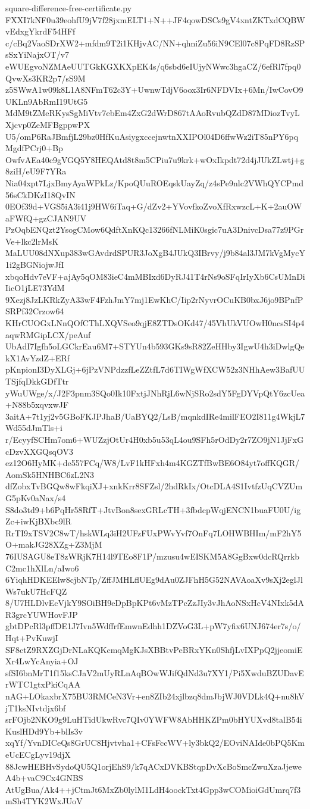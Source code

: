 \documentclass[11pt]{article}
\theoremstyle{definition}
\theoremstyle{remark}
\begin{document}
\begin{filecontents*}[overwrite]{square-difference-free-certificate.py}
FXXI7kNF0u39eohfU9jV7f28jxmELT1+N++JF4qowDSCs9gV4xntZKTxdCQBWvEdxgYkrdF54HFf
c/cBq2VaoSDrXW2+mfdm9T2i1KHjvAC/NN+qhniZu56iN9CEl07c8PqFD8RzSPsSxYiNajxOT/v7
eWUEgvoNZMAeUUTGkKGXKXpEK4s/q6sbd6eIUjyNWwc3hgaCZ/6efRl7fpq0QvwXs3KR2p7/sS9M
z5SWwA1w09k8L1A8NFmT62c3Y+UwnwTdjV6oox3Ir6NFDVIx+6Mn/IwCovO9UKLn9AbRmI19UtG5
MdM9tZMeRKysSgMiVtv7ebEm4ZxG2dWrD867tAAoRvubQZdD87MDiozTvyLXjcvp0ZeMFBgppwPX
U5/omP6RaJBmfjL29bz0HfKuAsiygxccejnwtnXXIPOl04D6ffwWz2iT85nPY6pqMgdfPCrj0+Bp
OwfvAEa40c9gVGQ5Y8HEQAtd8t8m5CPiu7u9krk+wOxIkpdt72d4jJUkZLwtj+g8ziH/eU9F7YRa
Nia04xpt7LjxBmyAyaWPkLz/KpoQUuROEqskUayZq/z4sPe9nlc2VWhQYCPmd56sCkDKzI18QvIN
0EOf39d+VGS5iA3i41j9HW6iTaq+G/dZv2+YVovfkoZvoXfRxwzcL+K+2auOWaFWfQ+gzCJAN9UV
PzOqbENQzt2YsogCMow6QdftXnKQc13266fNLMiK0sgic7uA3DnivcDsa77z9PGrVe+lkc2lrMsK
MaLUU08dNXup383wGAvdrdSPUR3JoXgB4JUkQ3IBrvy/j9b84al3JM7kVgMycY1i2gBGNiojwJfI
xbqoHdv7eVF+ajAy5qOM83ieC4mMBIxd6DyRJ41T4rNs9oSFqIrIyXb6CsUMnDiIicO1jLE73YdM
9Xezj8JzLKRkZyA33wF4FzhJmY7mj1EwKhC/Iip2rNyvrOCuKB0bxJ6jo9BPnfPSRPf32Crzow64
KHrCUOGxLNnQOfCThLXQVSeo9qjE8ZTDsOKd47/45VhUkVUOwH0ncsSI4p4aqwRMGipLCX/peAuf
UbAdI7Igfh5oLGCkrEau6M7+STYUn4b593GKs9sR82ZeHHby3IgwU4h3iDwlgQekX1AvYzdZ+ERf
pKnpionI3DyXLGj+6jPzVNPdzzfLeZZtfL7d6TIWgWfXCW52z3NHhAew3BafUUTSjfqDkkGDfTtr
yWuUWge/x/J2F3pnm3SQo0Ik10FxtjJNhRjL6wNjSRo2sdY5FgDYVpQtY6zcUea+N88b5xqvxwJF
3aitA+7t1yj2v5GBoFKJPJhaB/UaBYQ2/LsB/mqnkdIRe4milFEO2I811g4WkjL7Wd55dJmTls+i
r/EcyyfSCHm7om6+WUZzjOtUr4H0xb5u53qL4ou9SFh5rOdDy2r7ZO9jN1JjFxGcDzvXXGQsqOV3
ez12O6HyMK+de557FCq/W8/LvF1kHFxh4m4KGZTfBwBE6O84yt7offKQGR/AomSk5HNHBC6zL2N3
dfZobxTvBGQw8wFkqiXJ+xnkKrr8SFZsl/2hdRkIx/OtcDLA4S1IvtfzUqCVZUmG5pKv0aNax/s4
S8do3td9+b6PqHr58RfT+JtvBon8sexGRLcTH+3fbdcpWqjENCN1buaFU0U/igZc+iwKjBXbc9lR
RrTI9xTSV2C8wT/hskWLq3iH2UFzFUxPWvYvf7OnFq7LOHWBHIm/mF2hY5O+makJG28XZg+Z3MjM
76IUSAGU8eT8zWRjK7H14l9TEo8F1P/mzusu4wEISKM5A8GgBxw0dcRQrrkbC2mc1hXlLn/aIwo6
6YiqhHDKEElw8cjbNTp/ZffJMHLflUEg9dAu0ZJFhH5G52NAVAoaXv9sXj2eglJlWs7ukU7HcFQZ
8/U7HLDlvEcVjkY9SOiBH9eDpBpKPt6vMzTPcZzJIy3vJhAoNSxHcV4NIxk5dAR3grcYUWHovFJP
gbtDPcRl3pffDE1J7Ivn5WdffrfEmwnEdhh1DZVoG3L+pW7yfix6UNJ674er7s/o/Hqt+PvKuwjI
SF8ctZ9RXZGjDrNLaKQKcmqMgKJsXBBtvPeBRxYKn0ShfjLvIXPpQ2jjeomiEXr4LwYcAnyia+OJ
sfSI6bnMrT1f15ksCJaV2mUyRLnAqBOwWJifQdNd3u7XY1/Pi5XwduBZUDavErWTC1gtxPkiCqAA
nAG+LOkaxbrX75BU3RMCeN3Vr+en8ZIb24xjlbzq8dmJbjWJ0VDLk4Q+nu8hVjT1ksNIvtdjx6bf
srFOjb2NKO9g9LuHTidUkwRvc7QIv0YWFW8AbHHKZPm0bHYUXvd8talB54iKuslHDd9Yb+blIs3v
xqYf/YvnDICeQs8GrUC8Hjvtvha1+CFsFccWV+ly3bkQ2/EOviNAIde0bPQ5KmeUcECgLyv19djX
88JcwHEBHvSydoQU5Q1orjEhS9/k7qACxDVKBStqpDvXcBoSmcZwuXzaJjeweA4b+vaC9Cx4GNBS
AtUgBua/Ak4++jCtmJt6MxZb0lylM1LdH4oockTxt4Gpp3wCOMioiGdUmrq7f3mSh4TYK2WxJUoV

\end{filecontents*}
\end{document}
